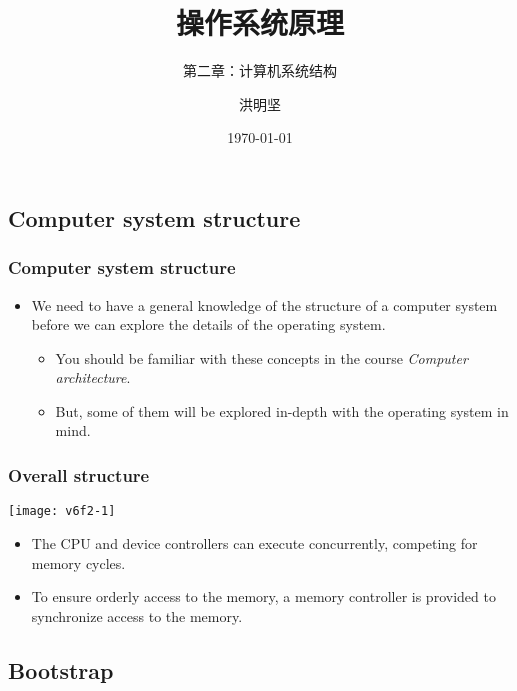 \documentclass[CJKutf8,dvipsnames,table]{beamer}
\title{操作系统原理}
\subtitle{第二章：计算机系统结构}
\author{洪明坚}
\institute{重庆大学软件学院}
\date{\today}
\newif\ifxetexorluatex %
\begin{document}
\ifxetexorluatex\else
\begin{CJK*}{UTF8}{song}
\fi


  \frame{\titlepage}


  \section{Computer system structure}

  \begin{frame}
    \frametitle{Computer system structure} \pause
    \begin{itemize}
    \item We need to have a general knowledge of the structure of a computer system before we can explore the details of the operating system.  \pause
      \begin{itemize}
      \item You should be familiar with these concepts in the course \emph{Computer architecture}.   \pause
      \item But, some of them will be explored in-depth with the operating system in mind.  \pause
      \end{itemize}
    \end{itemize}
  \end{frame}

  \begin{frame}
    \frametitle{Overall structure} \pause
    \begin{center}
      \texttt{[image: v6f2-1]} \pause
    \end{center}
    \begin{itemize}
    \item The CPU and device controllers can execute concurrently, competing for memory cycles.  \pause
    \item To ensure orderly access to the memory, a memory controller is provided to synchronize access to the memory. 
    \end{itemize}
  \end{frame}

  \subsection{Bootstrap}


\end{CJK*}
\end{document}
